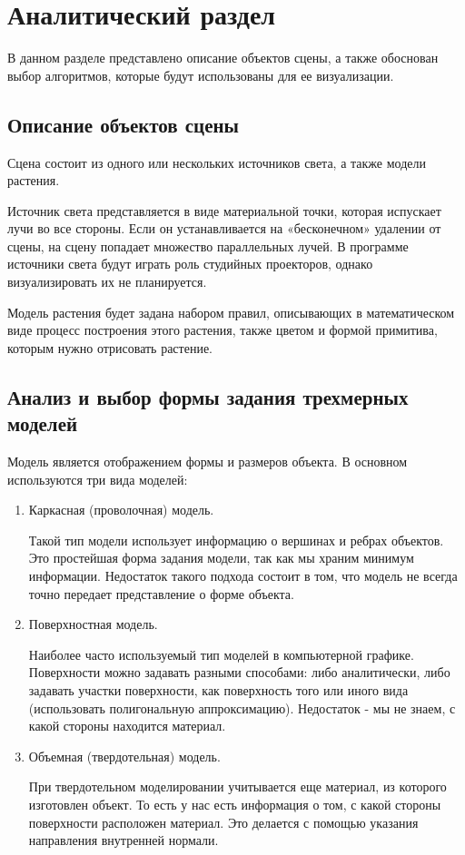 \chapter{Аналитический раздел}
В данном разделе представлено описание объектов сцены, а также обоснован выбор алгоритмов, которые будут использованы для ее визуализации. 

\section{Описание объектов сцены}

Сцена состоит из одного или нескольких источников света, а также модели растения.

Источник света представляется в виде материальной точки, которая испускает лучи во все стороны. Если он устанавливается на «бесконечном» удалении от сцены, на сцену попадает множество параллельных лучей. В
программе источники света будут играть роль студийных проекторов, однако визуализировать их не планируется.

Модель растения будет задана набором правил, описывающих в математическом виде процесс построения этого растения, также цветом и формой примитива, которым нужно отрисовать растение.

\section{Анализ и выбор формы задания трехмерных моделей}
Модель является отображением формы и размеров объекта. 
В основном используются три вида моделей:

\begin{enumerate}
	\item Каркасная (проволочная) модель.
	
    Такой тип модели использует информацию о вершинах и ребрах объектов. Это простейшая форма задания модели, так как мы храним минимум информации. Недостаток такого подхода состоит в том, что модель не всегда точно передает представление о форме объекта.

    
	\newpage
	\item Поверхностная модель.
	
	Наиболее часто используемый тип моделей в компьютерной графике. Поверхности можно задавать разными способами: либо аналитически, либо задавать участки поверхности, как поверхность того или иного вида (использовать полигональную аппроксимацию). Недостаток - мы не знаем, с какой стороны находится материал. 

	
	\item  Объемная (твердотельная) модель.
	
	При твердотельном моделировании учитывается еще материал, из которого изготовлен объект. То есть у нас есть информация о том, с какой стороны поверхности расположен материал. Это делается с помощью указания направления внутренней нормали.


\end{enumerate}

